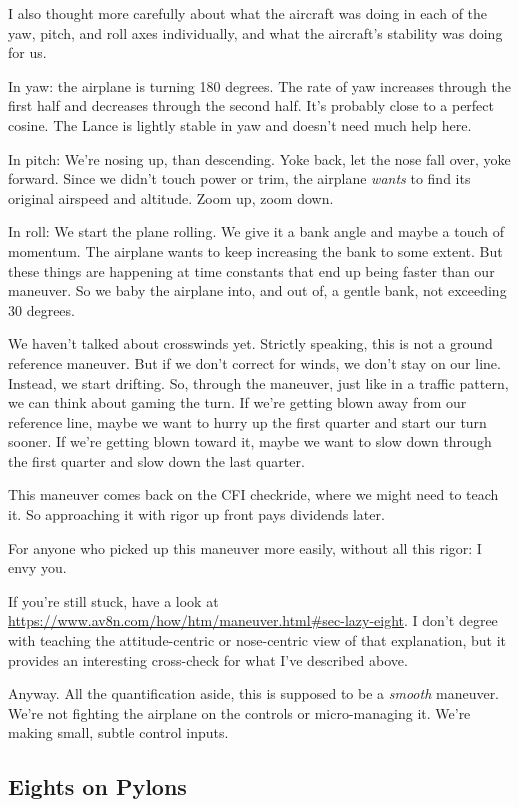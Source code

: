 I also thought more carefully about what the aircraft was doing in each of the yaw, pitch, and roll axes individually, and what the aircraft's stability was doing for us.

In yaw: the airplane is turning 180 degrees. The rate of yaw increases through the first half and decreases through the second half. It's probably close to a perfect cosine. The Lance is lightly stable in yaw and doesn't need much help here.

In pitch: We're nosing up, than descending. Yoke back, let the nose fall over, yoke forward. Since we didn't touch power or trim, the airplane \emph{wants} to find its original airspeed and altitude. Zoom up, zoom down.

In roll: We start the plane rolling. We give it a bank angle and maybe a touch of momentum. The airplane wants to keep increasing the bank to some extent. But these things are happening at time constants that end up being faster than our maneuver. So we baby the airplane into, and out of, a gentle bank, not exceeding 30 degrees.

We haven't talked about crosswinds yet. Strictly speaking, this is not a ground reference maneuver. But if we don't correct for winds, we don't stay on our line. Instead, we start drifting. So, through the maneuver, just like in a traffic pattern, we can think about gaming the turn. If we're getting blown away from our reference line, maybe we want to hurry up the first quarter and start our turn sooner. If we're getting blown toward it, maybe we want to slow down through the first quarter and slow down the last quarter.

This maneuver comes back on the CFI checkride, where we might need to teach it. So approaching it with rigor up front pays dividends later.

For anyone who picked up this maneuver more easily, without all this rigor: I envy you.

If you're still stuck, have a look at \url{https://www.av8n.com/how/htm/maneuver.html#sec-lazy-eight}. I don't degree with teaching the attitude-centric or nose-centric view of that explanation, but it provides an interesting cross-check for what I've described above.

Anyway. All the quantification aside, this is supposed to be a \emph{smooth} maneuver. We're not fighting the airplane on the controls or micro-managing it. We're making small, subtle control inputs.

\subsection{Eights on Pylons}

